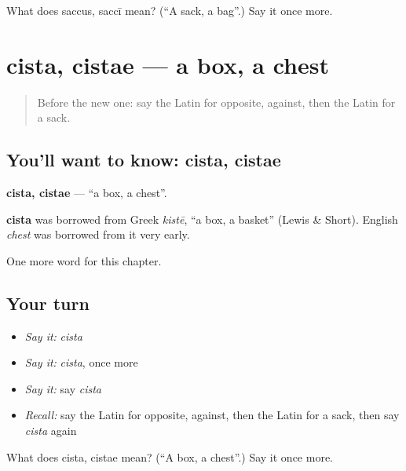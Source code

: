 \begin{tcolorbox}[breakable,colback=teal!4,colframe=teal!35!black,title={Before you move on}]
What does saccus, saccī mean? (\textquotedblleft{}A sack, a bag\textquotedblright{}.) Say it once more.
\end{tcolorbox}
\section[cista, cistae]{cista, cistae — a box, a chest}

\label{lesson:LA-C120-cista}



\begin{quote}
Before the new one: say the Latin for opposite, against, then the Latin for a sack.
\end{quote}

\subsection*{You'll want to know: cista, cistae}
\textbf{cista, cistae} — \textquotedblleft{}a box, a chest\textquotedblright{}.

\begin{cousinweb}
\textbf{cista} was borrowed from Greek \emph{kistē}, \textquotedblleft{}a box, a basket\textquotedblright{} (Lewis \& Short). English \emph{chest} was borrowed from it very early.
\end{cousinweb}

\begin{grammarlens}[title={What you've built}]
One more word for this chapter.
\end{grammarlens}

\subsection*{Your turn}
\begin{itemize}
\raggedright
  \item \emph{Say it:} \emph{cista}
  \item \emph{Say it:} \emph{cista}, once more
  \item \emph{Say it:} say \emph{cista}
  \item \emph{Recall:} say the Latin for opposite, against, then the Latin for a sack, then say \emph{cista} again
\end{itemize}

\begin{tcolorbox}[breakable,colback=teal!4,colframe=teal!35!black,title={Before you move on}]
What does cista, cistae mean? (\textquotedblleft{}A box, a chest\textquotedblright{}.) Say it once more.
\end{tcolorbox}
